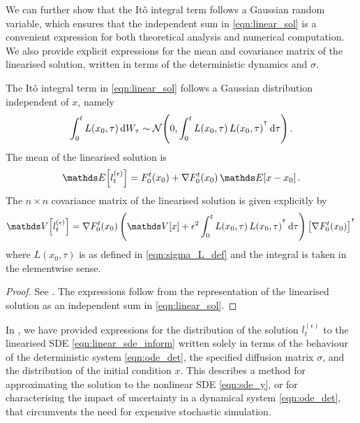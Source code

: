 We can further show that the It\^o integral term follows a Gaussian random variable, which ensures that the independent sum in \cref{eqn:linear_sol} is a convenient expression for both theoretical analysis and numerical computation.
We also provide explicit expressions for the mean and covariance matrix of the linearised solution, written in terms of the deterministic dynamics and \(\sigma\).
\begin{corollary}\label{cor:limit_moments}
	The It\^o integral term in \cref{eqn:linear_sol} follows a Gaussian distribution independent of \(x\), namely
	\[
		\int_0^t{L\!\left(x_0,\tau\right)\dif W_\tau} \isGauss{0, \int_0^t{L\!\left(x_0, \tau\right)L\!\left(x_0, \tau\right)^{\T}\dif\tau}}.
	\]
	The mean of the linearised solution is
	\begin{equation}
		\avg{l_t^{(\epsilon)}} = F_0^t\!\left(x_0\right) + \nabla F_0^t\!\left(x_0\right) \avg{x - x_0}.
		\label{eqn:mean_expl_eqn}
	\end{equation}
	The \(n\times n\) covariance matrix of the linearised solution is given explicitly by
	\begin{equation}
		\var{l_t^{(\epsilon)}} = \nabla F_0^t\!\left(x_0\right)\left(\var{x} + \epsilon^2 \int_0^t{L\!\left(x_0,\tau\right)L\!\left(x_0,\tau\right)^{\T}\dif\tau}\right)\left[\nabla F_0^t\!\left(x_0\right)\right]^{\T}
		\label{eqn:pi_expl_eqn}
	\end{equation}
	where \(L\!\left(x_0, \tau\right)\) is as defined in \cref{eqn:sigma_L_def} and the integral is taken in the elementwise sense.
\end{corollary}
\begin{proof}
	See .
	The expressions follow from the representation of the linearised solution as an independent sum in \cref{eqn:linear_sol}.
\end{proof}

In , we have provided expressions for the distribution of the solution \(l_t^{(\epsilon)}\) to the linearised SDE \cref{eqn:linear_sde_inform} written solely in terms of the behaviour of the deterministic system \cref{eqn:ode_det}, the specified diffusion matrix \(\sigma\), and the distribution of the initial condition \(x\).
This describes a method for approximating the solution to the nonlinear SDE \cref{eqn:sde_y}, or for characterising the impact of uncertainty in a dynamical system \cref{eqn:ode_det}, that circumvents the need for expensive stochastic simulation.

